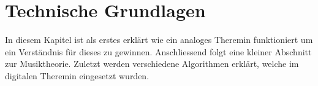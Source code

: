 \clearpage
\section{Technische Grundlagen}\label{sec:Technische Grundlagen}
In diesem Kapitel ist als erstes erklärt wie ein analoges Theremin funktioniert um ein Verständnis für dieses zu gewinnen. Anschliessend folgt eine kleiner Abschnitt zur Musiktheorie. Zuletzt werden verschiedene Algorithmen erklärt, welche im digitalen Theremin eingesetzt wurden.